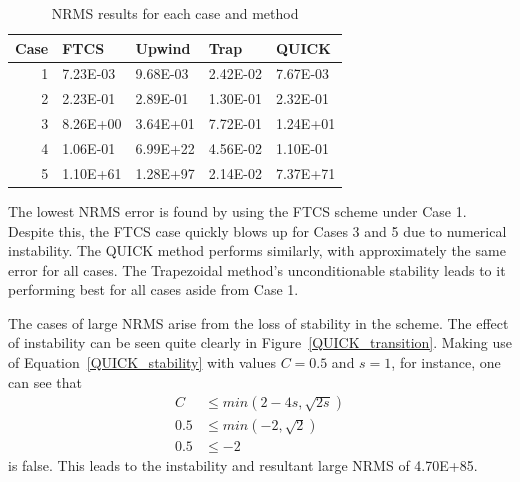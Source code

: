 \documentclass[twocolumn,10pt]{asme2ej}
\begin{document}
\begin{table}[tb]
\begin{center}
\begin{tabular}{|r | l l l l|}
\hline
Case & FTCS & Upwind & Trap & QUICK  \\
\hline
1 & 7.23E-03 & 9.68E-03 & 2.42E-02 & 7.67E-03 \\
2 & 2.23E-01 & 2.89E-01 & 1.30E-01 & 2.32E-01 \\
3 & 8.26E+00 & 3.64E+01 & 7.72E-01 & 1.24E+01 \\
4 & 1.06E-01 & 6.99E+22 & 4.56E-02 & 1.10E-01 \\
5 & 1.10E+61 & 1.28E+97 & 2.14E-02 & 7.37E+71 \\
\hline
\end{tabular}
\caption{NRMS results for each case and method}
\label{rms_table}
\end{center}
\end{table}

The lowest NRMS error is found by using the FTCS scheme under Case 1. Despite this, the FTCS case quickly blows up for Cases 3 and 5 due to numerical instability. The QUICK method performs similarly, with approximately the same error for all cases. The Trapezoidal method's unconditionable stability leads to it performing best for all cases aside from Case 1.

The cases of large NRMS arise from the loss of stability in the scheme. The effect of instability can be seen quite clearly in Figure~\ref{QUICK_transition}. Making use of Equation~\ref{QUICK_stability} with values $C=0.5$ and $s=1$, for instance, one can see that
\begin{equation}
\begin{split}
C   & \leq min(2 - 4 s, \sqrt{2s}) \\
0.5 & \leq min(-2, \sqrt 2) \\
0.5 & \leq -2
\end{split}
\end{equation}
is false. This leads to the instability and resultant large NRMS of 4.70E+85.
\end{document}
